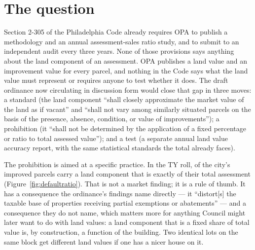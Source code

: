 \documentclass[11pt]{article}
\begin{document}
\begin{abstract}
tax model, it reverses the sign of the ordinance's fiscal effect --- the levy
\LycdSfiveCLevySign{} by \LycdSfiveCLevyAbsM{} rather than falling --- so the direction depends on
the land model, and the one the sales support goes the other way. The land model also decides
who a land tax would fall on. A 4:1 split-rate built on OPA's land values or on the allocation is
flat to regressive by neighbourhood income and race. Built on the sales-based surface it is
progressive on both: homes' total bill changes by \LycdEqSfiveEndsHomesNonwhite{} in the most
non-white fifth of block groups against \LycdEqSfiveEndsHomesWhite{} in the whitest, and by
\LycdEqSfiveEndsHomesPoor{} in the poorest fifth against \LycdEqSfiveEndsHomesRich{} in the
richest. That ordering holds under every treatment of the construction abatement.
\end{abstract}

\section{The question}

Section 2-305 of the Philadelphia Code already requires OPA to publish a methodology and an %
annual assessment-sales ratio study, and to submit to an independent audit every three years.
None of those provisions says anything about the land component of an assessment. OPA
publishes a land value and an improvement value for every parcel, and nothing in the Code says
what the land value must represent or requires anyone to test whether it does. The draft
ordinance now circulating in discussion form would close that gap in three moves: a standard
(the land component ``shall closely approximate the market value of the land as if vacant''
and ``shall not vary among similarly situated parcels on the basis of the presence, absence,
condition, or value of improvements''); a prohibition (it ``shall not be determined by the
application of a fixed percentage or ratio to total assessed value''); and a test (a separate
annual land value accuracy report, with the same statistical standards the total already faces).

The prohibition is aimed at a specific practice. In the TY\LycdTaxYear{} roll,
\LycdDefaultRatioOpaPct{} of the city's \LycdDefaultRatioImprovedParcels{} improved parcels carry a
land component that is exactly \LycdDefaultRatioOpaMode{} of their total assessment
(Figure~\ref{fig:defaultratio}). That is not a market finding; it is a rule of thumb. It has a
consequence the ordinance's findings name directly --- it ``distort[s] the taxable base of
properties receiving partial exemptions or abatements'' --- and a consequence they do not name,
which matters more for anything Council might later want to do with land values: a land
component that is a fixed share of total value is, by construction, a function of the building.
Two identical lots on the same block get different land values if one has a nicer house on it.
\end{document}
